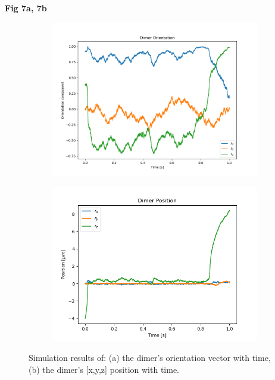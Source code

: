 \documentclass[final,  3p]{elsarticle}
\begin{document}
\begin{center}
	\bf{Fig 7a, 7b}
\end{center}
\begin{figure}[h]
	\centering
	\begin{subfigure}{0.45\textwidth}
		\subcaption{}
		\includegraphics[width =\textwidth]{./Images/fig7a.png}
	\end{subfigure}
	\begin{subfigure}{0.45\textwidth}
		\subcaption{}
		\includegraphics[width=\textwidth]{./Images/fig7b.png}
	\end{subfigure}
	\caption{Simulation results of: (a) the dimer's orientation vector with time, (b) the dimer's [x,y,z] position with time.}
	\label{fig:motion}
\end{figure}
\end{document}
